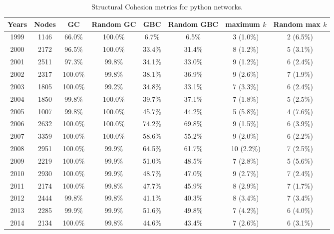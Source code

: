 \begin{table}[H]
\begin{center}
\begin{tabular}{|c|c|c|c|c|c|c|c|}
\hline
Years&Nodes&GC&Random GC&GBC&Random GBC&maximum $k$&Random max $k$\\
\hline
1999&1146&66.0\%&100.0\%&6.7\%&6.5\%&3 (1.0\%)&2 (6.5\%)\\
2000&2172&96.5\%&100.0\%&33.4\%&31.4\%&8 (1.2\%)&5 (3.1\%)\\
2001&2511&97.3\%&99.8\%&34.1\%&33.0\%&9 (1.2\%)&6 (2.4\%)\\
2002&2317&100.0\%&99.8\%&38.1\%&36.9\%&9 (2.6\%)&7 (1.9\%)\\
2003&1805&100.0\%&99.2\%&34.8\%&33.1\%&7 (3.3\%)&6 (2.4\%)\\
2004&1850&99.8\%&100.0\%&39.7\%&37.1\%&7 (1.8\%)&5 (2.5\%)\\
2005&1007&99.8\%&100.0\%&45.7\%&44.2\%&5 (5.8\%)&4 (7.6\%)\\
2006&2632&100.0\%&100.0\%&74.2\%&69.8\%&9 (1.5\%)&6 (3.9\%)\\
2007&3359&100.0\%&100.0\%&58.6\%&55.2\%&9 (2.0\%)&6 (2.2\%)\\
2008&2951&100.0\%&99.9\%&64.5\%&61.7\%&10 (2.2\%)&7 (2.5\%)\\
2009&2219&100.0\%&99.9\%&51.0\%&48.5\%&7 (2.8\%)&5 (5.6\%)\\
2010&2930&100.0\%&99.9\%&48.7\%&47.0\%&9 (2.7\%)&7 (2.4\%)\\
2011&2174&100.0\%&99.8\%&47.7\%&45.9\%&8 (2.9\%)&7 (1.7\%)\\
2012&2444&99.8\%&99.8\%&41.1\%&40.3\%&8 (3.4\%)&7 (3.4\%)\\
2013&2285&99.9\%&99.9\%&51.6\%&49.8\%&7 (4.2\%)&6 (4.0\%)\\
2014&2134&100.0\%&99.8\%&44.6\%&43.4\%&7 (2.6\%)&6 (3.1\%)\\
\hline
\end{tabular}
\caption{Structural Cohesion metrics for python networks.}
\label{str_cohesion_python}
\end{center}
\end{table}

